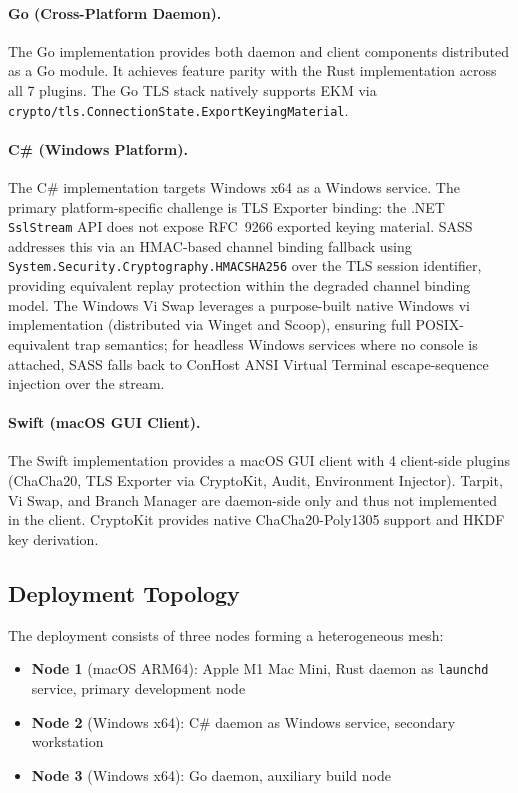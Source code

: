 \documentclass[sigconf,anonymous]{acmart}
\begin{document}
\paragraph{Go (Cross-Platform Daemon).}
The Go implementation provides both daemon and client components distributed as a Go module. It achieves feature parity with the Rust implementation across all 7 plugins. The Go TLS stack natively supports EKM via \texttt{crypto/tls.ConnectionState.ExportKeyingMaterial}.

\paragraph{C\# (Windows Platform).}
The C\# implementation targets Windows x64 as a Windows service. The primary platform-specific challenge is TLS Exporter binding: the .NET \texttt{SslStream} API does not expose RFC~9266 exported keying material. SASS addresses this via an HMAC-based channel binding fallback using \texttt{System.Security.Cryptography.HMACSHA256} over the TLS session identifier, providing equivalent replay protection within the degraded channel binding model. The Windows Vi Swap leverages a purpose-built native Windows vi implementation (distributed via Winget and Scoop), ensuring full POSIX-equivalent trap semantics; for headless Windows services where no console is attached, SASS falls back to ConHost ANSI Virtual Terminal escape-sequence injection over the stream.

\paragraph{Swift (macOS GUI Client).}
The Swift implementation provides a macOS GUI client with 4 client-side plugins (ChaCha20, TLS Exporter via CryptoKit, Audit, Environment Injector). Tarpit, Vi Swap, and Branch Manager are daemon-side only and thus not implemented in the client. CryptoKit provides native ChaCha20-Poly1305 support and HKDF key derivation.

\subsection{Deployment Topology}

The deployment consists of three nodes forming a heterogeneous mesh:

\begin{itemize}
\item \textbf{Node 1} (macOS ARM64): Apple M1 Mac Mini, Rust daemon as \texttt{launchd} service, primary development node
\item \textbf{Node 2} (Windows x64): C\# daemon as Windows service, secondary workstation
\item \textbf{Node 3} (Windows x64): Go daemon, auxiliary build node
\end{itemize}
\end{document}
